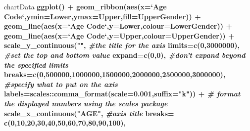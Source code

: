 \documentclass[]{article}
\newenvironment{Shaded}{\begin{snugshade}}{\end{snugshade}}
\newcommand{\KeywordTok}[1]{\textcolor[rgb]{0.13,0.29,0.53}{\textbf{#1}}}
\newcommand{\DataTypeTok}[1]{\textcolor[rgb]{0.13,0.29,0.53}{#1}}
\newcommand{\DecValTok}[1]{\textcolor[rgb]{0.00,0.00,0.81}{#1}}
\newcommand{\FloatTok}[1]{\textcolor[rgb]{0.00,0.00,0.81}{#1}}
\newcommand{\StringTok}[1]{\textcolor[rgb]{0.31,0.60,0.02}{#1}}
\newcommand{\CommentTok}[1]{\textcolor[rgb]{0.56,0.35,0.01}{\textit{#1}}}
\newcommand{\OperatorTok}[1]{\textcolor[rgb]{0.81,0.36,0.00}{\textbf{#1}}}
\newcommand{\NormalTok}[1]{#1}
\begin{document}
\begin{Shaded}
\begin{Highlighting}[]
\NormalTok{chartData }\OperatorTok{%>%}\StringTok{ }\KeywordTok{filter}\NormalTok{(Year}\OperatorTok{==}\DecValTok{2014}\NormalTok{) }\OperatorTok{%>%}
\StringTok{  }\KeywordTok{ggplot}\NormalTok{() }\OperatorTok{+}
\StringTok{  }\KeywordTok{geom_ribbon}\NormalTok{(}\KeywordTok{aes}\NormalTok{(}\DataTypeTok{x=}\StringTok{`}\DataTypeTok{Age Code}\StringTok{`}\NormalTok{,}\DataTypeTok{ymin=}\NormalTok{Lower,}\DataTypeTok{ymax=}\NormalTok{Upper,}\DataTypeTok{fill=}\NormalTok{UpperGender)) }\OperatorTok{+}
\StringTok{  }\KeywordTok{geom_line}\NormalTok{(}\KeywordTok{aes}\NormalTok{(}\DataTypeTok{x=}\StringTok{`}\DataTypeTok{Age Code}\StringTok{`}\NormalTok{,}\DataTypeTok{y=}\NormalTok{Lower,}\DataTypeTok{colour=}\NormalTok{LowerGender)) }\OperatorTok{+}
\StringTok{  }\KeywordTok{geom_line}\NormalTok{(}\KeywordTok{aes}\NormalTok{(}\DataTypeTok{x=}\StringTok{`}\DataTypeTok{Age Code}\StringTok{`}\NormalTok{,}\DataTypeTok{y=}\NormalTok{Upper,}\DataTypeTok{colour=}\NormalTok{UpperGender)) }\OperatorTok{+}
\StringTok{  }\KeywordTok{scale_y_continuous}\NormalTok{(}\StringTok{""}\NormalTok{, }\CommentTok{#the title for the axis}
                     \DataTypeTok{limits=}\KeywordTok{c}\NormalTok{(}\DecValTok{0}\NormalTok{,}\DecValTok{3000000}\NormalTok{), }\CommentTok{#set the top and bottom value}
                     \DataTypeTok{expand=}\KeywordTok{c}\NormalTok{(}\DecValTok{0}\NormalTok{,}\DecValTok{0}\NormalTok{), }\CommentTok{#don't expand beyond the specified limits}
                     \DataTypeTok{breaks=}\KeywordTok{c}\NormalTok{(}\DecValTok{0}\NormalTok{,}\DecValTok{500000}\NormalTok{,}\DecValTok{1000000}\NormalTok{,}\DecValTok{1500000}\NormalTok{,}\DecValTok{2000000}\NormalTok{,}\DecValTok{2500000}\NormalTok{,}\DecValTok{3000000}\NormalTok{), }\CommentTok{#specify what to put on the axis}
                     \DataTypeTok{labels=}\NormalTok{scales}\OperatorTok{::}\KeywordTok{comma_format}\NormalTok{(}\DataTypeTok{scale=}\FloatTok{0.001}\NormalTok{,}\DataTypeTok{suffix=}\StringTok{"k"}\NormalTok{)) }\OperatorTok{+}\StringTok{ }\CommentTok{# format the displayed numbers using the scales package}
\StringTok{  }\KeywordTok{scale_x_continuous}\NormalTok{(}\StringTok{"AGE"}\NormalTok{, }\CommentTok{#axis title}
                     \DataTypeTok{breaks=} \KeywordTok{c}\NormalTok{(}\DecValTok{0}\NormalTok{,}\DecValTok{10}\NormalTok{,}\DecValTok{20}\NormalTok{,}\DecValTok{30}\NormalTok{,}\DecValTok{40}\NormalTok{,}\DecValTok{50}\NormalTok{,}\DecValTok{60}\NormalTok{,}\DecValTok{70}\NormalTok{,}\DecValTok{80}\NormalTok{,}\DecValTok{90}\NormalTok{,}\DecValTok{100}\NormalTok{),}
}
\end{Highlighting}
\end{Shaded}
\end{document}
